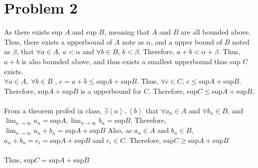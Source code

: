 \documentclass{article}
\begin{document}
\section*{Problem 2}
As there exists sup \(A\) and sup \(B\), meaning that \(A\) and \(B\) are all bounded above.
Thus, there exists a upperbound of \(A\) note as \(\alpha\), and a upper bound of \(B\) noted as 
\(\beta\), that \(\forall a\in A\), \(a<\alpha\) and \(\forall b \in B\), \(b<\beta\). Therefore, \(a+b<\alpha + \beta\).
Thus, \(a+b\) is also bounded above, and thus exists a smallest upperbound thus sup \(C\) exists.\\
\(\forall a\in A,\ \forall b\in B\) , \(c=a+b\leqslant \text{sup}A+\text{sup}B\). Thus, \(\forall c \in C\), \(c\leqslant \text{sup}A+\text{sup}B\).
Therefore, \(\text{sup}A+\text{sup}B\) is a upperbound for \(C\). Therefore, sup\(C\leqslant\text{sup}A+\text{sup}B\).\\
\\
From a theorem profed in class, \(\exists \left<a\right>, \left<b\right>\) that \(\forall a_n\in A\) and \(\forall b_n \in B\), and 
\(\displaystyle \lim_{n\rightarrow\infty}a_n =\text{sup}A, \lim_{n\rightarrow\infty}b_n =\text{sup}B\). Therefore, \(\displaystyle\lim_{n\rightarrow \infty}{a_n+b_n} = \text{sup}A+\text{sup}B\)
Also, as \(a_n\in A\) and \(b_n\in B\), \(a_n+b_n=c_i=\text{sup}A+\text{sup}B\) and \(c_i\in C\). Therefore, \(\text{sup}C\geqslant\text{sup}A+\text{sup}B\)
\\ \\
Thus, \(\text{sup}C=\text{sup}A+\text{sup}B\)
\end{document}
